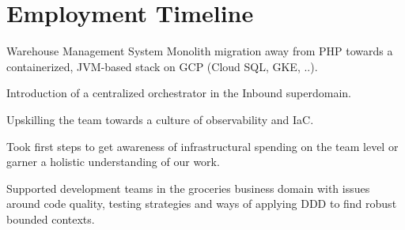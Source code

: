 \documentclass[]{resume}
\begin{document}
\begin{minipage}[t]{0.64\textwidth} 


\section{Employment Timeline}

\vspace{\topsep} %
\begin{tightemize}
\item Warehouse Management System Monolith migration away from PHP towards a containerized, JVM-based stack on GCP (Cloud SQL, GKE, ..).
\item Introduction of a centralized orchestrator in the Inbound superdomain.
\item Upskilling the team towards a culture of observability and IaC.
\item Took first steps to get awareness of infrastructural spending on the team level or garner a holistic understanding of our work.
\end{tightemize}
\sectionsep

\vspace{\topsep} %
Supported development teams in the groceries business domain with issues around code quality, testing strategies and ways of applying DDD to find robust bounded contexts.
\sectionsep


\end{minipage}
\end{document}
